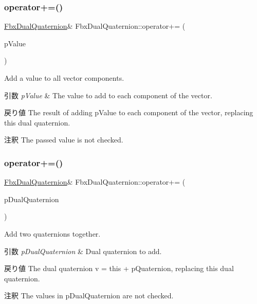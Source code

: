 \subsubsection{\texorpdfstring{operator+=()}{operator+=()}\hspace{0.1cm}{\footnotesize\ttfamily [1/2]}}
{\footnotesize\ttfamily \hyperlink{class_fbx_dual_quaternion}{Fbx\+Dual\+Quaternion}\& Fbx\+Dual\+Quaternion\+::operator+= (\begin{DoxyParamCaption}\item[{double}]{p\+Value }\end{DoxyParamCaption})}

Add a value to all vector components. 
\begin{DoxyParams}{引数}
{\em p\+Value} & The value to add to each component of the vector. \\
\hline
\end{DoxyParams}
\begin{DoxyReturn}{戻り値}
The result of adding p\+Value to each component of the vector, replacing this dual quaternion. 
\end{DoxyReturn}
\begin{DoxyRemark}{注釈}
The passed value is not checked. 
\end{DoxyRemark}
\mbox{\label{class_fbx_dual_quaternion_a5fac21150ee0620e4cee681adc812e8c}} 
\subsubsection{\texorpdfstring{operator+=()}{operator+=()}\hspace{0.1cm}{\footnotesize\ttfamily [2/2]}}
{\footnotesize\ttfamily \hyperlink{class_fbx_dual_quaternion}{Fbx\+Dual\+Quaternion}\& Fbx\+Dual\+Quaternion\+::operator+= (\begin{DoxyParamCaption}\item[{const \hyperlink{class_fbx_dual_quaternion}{Fbx\+Dual\+Quaternion} \&}]{p\+Dual\+Quaternion }\end{DoxyParamCaption})}

Add two quaternions together. 
\begin{DoxyParams}{引数}
{\em p\+Dual\+Quaternion} & Dual quaternion to add. \\
\hline
\end{DoxyParams}
\begin{DoxyReturn}{戻り値}
The dual quaternion v\textquotesingle{} = this + p\+Quaternion, replacing this dual quaternion. 
\end{DoxyReturn}
\begin{DoxyRemark}{注釈}
The values in p\+Dual\+Quaternion are not checked. 
\end{DoxyRemark}
\mbox{\label{class_fbx_dual_quaternion_a9900013ba99f3503e574e05516b47082}} 
